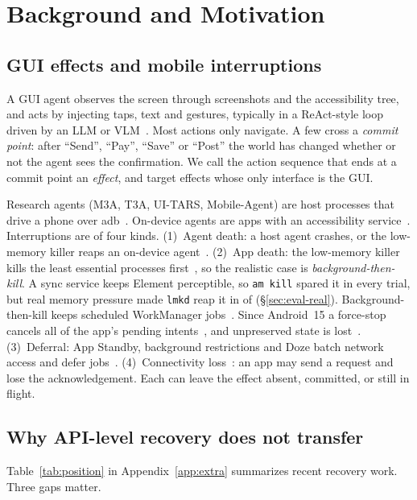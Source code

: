 \section{Background and Motivation}
\label{sec:background}

\subsection{GUI effects and mobile interruptions}
\label{sec:bg-effects}
A GUI agent observes the screen through screenshots and the accessibility tree, and acts by injecting taps, text and gestures,
typically in a ReAct-style loop driven by an LLM or VLM~\cite{yao2023react,rawles2025androidworld,qin2025uitars}. Most actions only navigate.
A few cross a \emph{commit point}: after ``Send'', ``Pay'', ``Save'' or ``Post'' the world has changed whether or not the agent sees the
confirmation. We call the action sequence that ends at a commit point an \emph{effect}, and target effects whose only interface is the GUI.

Research agents (M3A, T3A, UI-TARS, Mobile-Agent) are host processes that drive a phone over adb~\cite{rawles2025androidworld}. On-device agents are apps with an
accessibility service~\cite{wen2024autodroid}. Interruptions are of four kinds. (1)~Agent death: a host agent crashes, or the low-memory killer reaps an on-device
agent~\cite{android_lmkd}. (2)~App death: the low-memory killer kills the least essential processes first~\cite{android_lmkd}, so the realistic case is \emph{background-then-kill}. A sync service keeps Element perceptible, so \texttt{am kill} spared it in every trial, but real memory pressure made \texttt{lmkd} reap it in \RealElmkReaped{} of \RealElmkN{} (\S\ref{sec:eval-real}). Background-then-kill keeps scheduled
WorkManager jobs~\cite{android_workmanager}. Since Android~15 a force-stop cancels all of the app's pending intents~\cite{android15_behavior}, and unpreserved state is lost~\cite{farooq2020livedroid}. (3)~Deferral:
App Standby, background restrictions and Doze batch network access and defer jobs~\cite{android_doze,android_standby}. (4)~Connectivity loss~\cite{rfc1047}:
an app may send a request and lose the acknowledgement. Each can leave the effect absent, committed, or still in flight.

\subsection{Why API-level recovery does not transfer}
\label{sec:bg-gap}
Table~\ref{tab:position} in Appendix~\ref{app:extra} summarizes recent recovery work. Three gaps matter.

